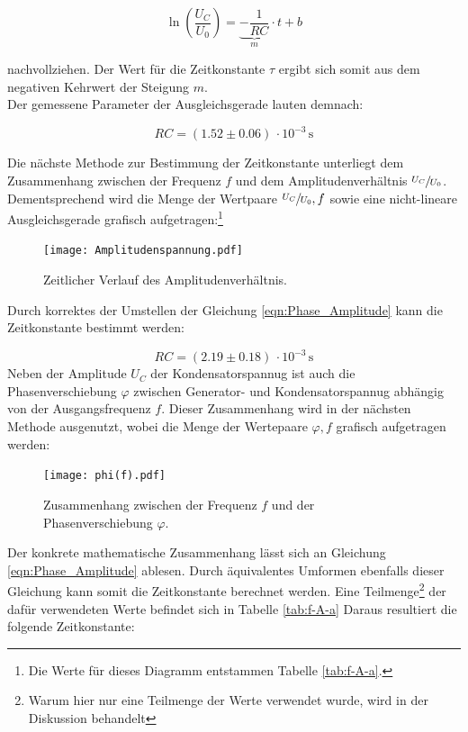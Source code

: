 \begin{equation}
    \ln\left(\frac{U_C}{U_0}\right) = \underbrace{-\frac{1}{RC}}_m \cdot t + b
\end{equation}

\noindent nachvollziehen. Der Wert für die Zeitkonstante $\tau$ ergibt sich somit aus dem negativen Kehrwert der Steigung $m$.\\
Der gemessene Parameter der Ausgleichsgerade lauten demnach:

\begin{equation}
    RC = \left(1.52 \pm 0.06\right)\,\cdot 10^{-3}\,\unit{\second}
\end{equation}

\noindent Die nächste Methode zur Bestimmung der Zeitkonstante unterliegt dem Zusammenhang zwischen der Frequenz $f$ und dem 
Amplitudenverhältnis $\sfrac{U_C}{U_0}$. Dementsprechend wird die Menge der Wertpaare ${\sfrac{U_C}{U_0},f}$ sowie eine 
nicht-lineare Ausgleichsgerade grafisch aufgetragen:\footnote{Die Werte für dieses Diagramm entstammen Tabelle \ref{tab:f-A-a}.}

\begin{figure}
    \centering
    \texttt{[image: Amplitudenspannung.pdf]}
    \caption{Zeitlicher Verlauf des Amplitudenverhältnis.}
    \label{fig:Amplitudenverlauf}
\end{figure}

\noindent Durch korrektes der Umstellen der Gleichung \eqref{eqn:Phase_Amplitude} kann die Zeitkonstante bestimmt werden:

\begin{equation}
    RC = \left(2.19 \pm 0.18\right)\,\cdot 10^{-3}\,\unit{\second}
\end{equation}
\newpage
\noindent Neben der Amplitude $U_C$ der Kondensatorspannug ist auch die Phasenverschiebung $\varphi$ zwischen Generator- und
Kondensatorspannug abhängig von der Ausgangsfrequenz $f$. Dieser Zusammenhang wird in der nächsten Methode ausgenutzt, wobei 
die Menge der Wertepaare ${\varphi , f}$ grafisch aufgetragen werden: 

\begin{figure}[H]
    \centering
    \texttt{[image: phi(f).pdf]}
    \caption{Zusammenhang zwischen der Frequenz $f$ und der Phasenverschiebung $\varphi$.}
    \label{fig:Phasenverschiebung}
\end{figure}

\noindent Der konkrete mathematische Zusammenhang lässt sich an 
Gleichung \eqref{eqn:Phase_Amplitude} ablesen. Durch äquivalentes Umformen ebenfalls dieser Gleichung kann somit die Zeitkonstante
berechnet werden. Eine Teilmenge\footnote{Warum hier nur eine Teilmenge der Werte verwendet wurde, wird in der Diskussion behandelt} der dafür verwendeten Werte befindet sich in Tabelle \ref{tab:f-A-a}
Daraus resultiert die folgende Zeitkonstante:

